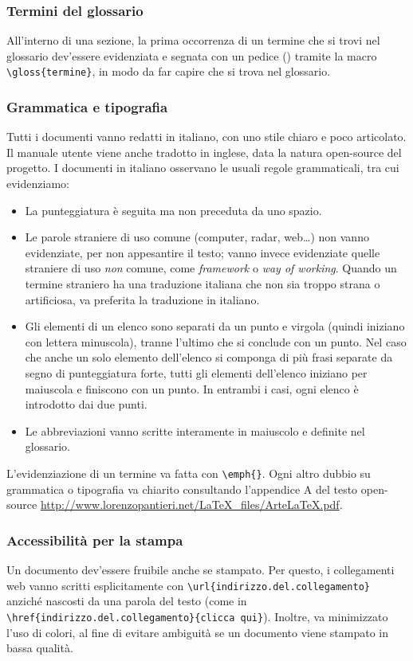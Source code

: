 \subsubsection{Termini del glossario} All'interno di una sezione, la prima occorrenza di un termine che si trovi nel glossario dev'essere evidenziata e segnata con un pedice () tramite la macro \texttt{\textbackslash gloss\{termine\}}, in modo da far capire che si trova nel glossario.

\subsubsection{Grammatica e tipografia} Tutti i documenti vanno redatti in italiano, con uno stile chiaro e poco articolato. Il manuale utente viene anche tradotto in inglese, data la natura open-source del progetto. I documenti in italiano osservano le usuali regole grammaticali, tra cui evidenziamo:
\begin{itemize}
	\item La punteggiatura è seguita ma non preceduta da uno spazio.
	\item Le parole straniere di uso comune (computer, radar, web\dots) non vanno evidenziate, per non appesantire il testo; vanno invece evidenziate quelle straniere di uso \emph{non} comune, come \emph{framework} o \emph{way of working}. Quando un termine straniero ha una traduzione italiana che non sia troppo strana o artificiosa, va preferita la traduzione in italiano.
	\item Gli elementi di un elenco sono separati da un punto e virgola (quindi iniziano con lettera minuscola), tranne l'ultimo che si conclude con un punto. Nel caso che anche un solo elemento dell'elenco si componga di più frasi separate da segno di punteggiatura forte, tutti gli elementi dell'elenco iniziano per maiuscola e finiscono con un punto. In entrambi i casi, ogni elenco è introdotto dai due punti.
	\item Le abbreviazioni vanno scritte interamente in maiuscolo e definite nel glossario.
\end{itemize}
L'evidenziazione di un termine va fatta con \texttt{\textbackslash emph\{\}}. Ogni altro dubbio su grammatica o tipografia va chiarito consultando l'appendice A del testo open-source \url{http://www.lorenzopantieri.net/LaTeX_files/ArteLaTeX.pdf}.

\subsubsection{Accessibilità per la stampa} Un documento dev'essere fruibile anche se stampato. Per questo, i collegamenti web vanno scritti esplicitamente con \texttt{\textbackslash url\{indirizzo.del.collegamento\}} anziché nascosti da una parola del testo (come in \texttt{\textbackslash href\{indirizzo.del.collegamento\}\{clicca qui\}}). Inoltre, va minimizzato l'uso di colori, al fine di evitare ambiguità se un documento viene stampato in bassa qualità.




